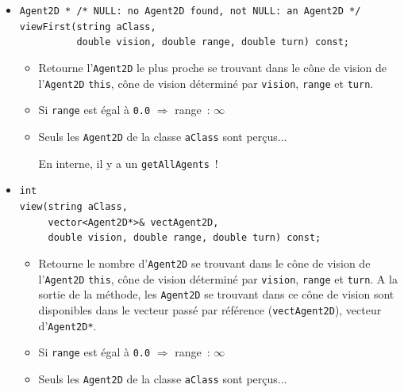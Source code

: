 \documentclass[12pt]{article}
\begin{document}
\begin{itemize}
\item \verb!Agent2D * /* NULL: no Agent2D found, not NULL: an Agent2D */!\\
      \verb!viewFirst(string aClass,!\\
      \verb!          double vision, double range, double turn) const;!
      \begin{itemize}
      \item Retourne l'{\tt Agent2D} le plus proche se trouvant dans le
            c\^one de vision de l'{\tt Agent2D} {\tt *this}, c\^one de vision
            d\'etermin\'e par {\tt vision}, {\tt range} et {\tt turn}.
      \item Si {\tt range} est \'egal \`a {\tt 0.0}
            $\Longrightarrow$ range~: $\infty$ 
      \item Seuls les {\tt Agent2D} de la classe {\tt aClass} sont
            per\c cus...

            En interne, il y a un {\tt getAllAgents}~!
      \end{itemize}
\vspace{-0.3cm}
\item \verb!int!\\
      \verb!view(string aClass,!\\
      \verb!     vector<Agent2D*>& vectAgent2D,!\\
      \verb!     double vision, double range, double turn) const;!
      \begin{itemize}
      \item Retourne le nombre d'{\tt Agent2D} se trouvant dans le
            c\^one de vision de l'{\tt Agent2D} {\tt *this},
            c\^one de vision d\'etermin\'e par {\tt vision}, {\tt range}
            et {\tt turn}.
            A la sortie de la m\'ethode, les {\tt Agent2D} se trouvant dans
            ce c\^one de vision sont disponibles dans le vecteur pass\'e
            par r\'ef\'erence ({\tt vectAgent2D}), vecteur d'{\tt Agent2D*}.
      \item Si {\tt range} est \'egal \`a {\tt 0.0}
            $\Longrightarrow$ range~: $\infty$ 
      \item Seuls les {\tt Agent2D} de la classe {\tt aClass} sont
            per\c cus...


\end{itemize}
\end{itemize}
\end{document}
